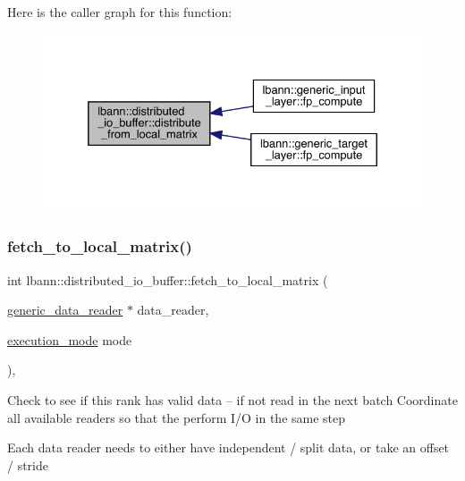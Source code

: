 Here is the caller graph for this function\+:\nopagebreak
\begin{figure}[H]
\begin{center}
\leavevmode
\includegraphics[width=332pt]{classlbann_1_1distributed__io__buffer_a3a770ec2314313761d6f0eccdb9dc09b_icgraph}
\end{center}
\end{figure}
\mbox{\label{classlbann_1_1distributed__io__buffer_abfeb87d4dc402b482db60926ca9b3ec1}} 
\subsubsection{\texorpdfstring{fetch\+\_\+to\+\_\+local\+\_\+matrix()}{fetch\_to\_local\_matrix()}}
{\footnotesize\ttfamily int lbann\+::distributed\+\_\+io\+\_\+buffer\+::fetch\+\_\+to\+\_\+local\+\_\+matrix (\begin{DoxyParamCaption}\item[{\hyperlink{classlbann_1_1generic__data__reader}{generic\+\_\+data\+\_\+reader} $\ast$}]{data\+\_\+reader,  }\item[{\hyperlink{base_8hpp_a2781a159088df64ed7d47cc91c4dc0a8}{execution\+\_\+mode}}]{mode }\end{DoxyParamCaption})\hspace{0.3cm}{\ttfamily [override]}, {\ttfamily [virtual]}}

Check to see if this rank has valid data -- if not read in the next batch Coordinate all available readers so that the perform I/O in the same step

Each data reader needs to either have independent / split data, or take an offset / stride 

